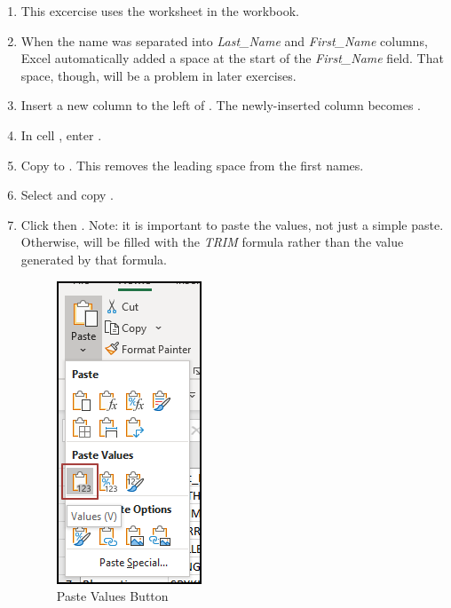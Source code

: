 \begin{enumerate}
	\item This excercise uses the  worksheet in the  workbook.
	\item When the name was separated into \textit{Last\_Name} and \textit{First\_Name} columns, Excel automatically added a space at the start of the \textit{First\_Name} field. That space, though, will be a problem in later exercises. 
	\item Insert a new column to the left of . The newly-inserted column becomes .
	\item In cell , enter .
	\item Copy  to . This removes the leading space from the first names.
	\item Select and copy .
	\item Click  then . Note: it is important to paste the values, not just a simple paste. Otherwise,  will be filled with the \textit{TRIM} formula rather than the value generated by that formula.
	
	\begin{figure}[H]
		\centering
		\includegraphics[width=\maxwidth{.65\linewidth}]{gfx/ch09_fig34}
		\caption{Paste Values Button}
		\label{09:fig34}
	\end{figure}
	

\end{enumerate}
